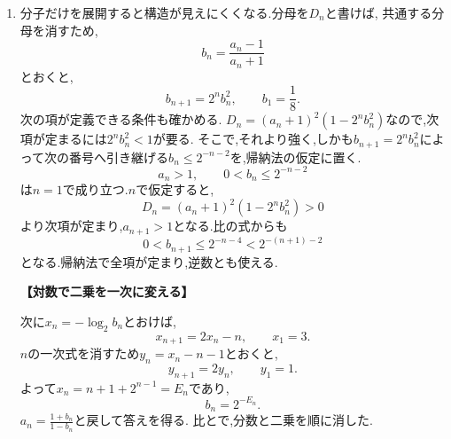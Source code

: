 \begin{enumerate}[label=\textbf{問\arabic*.},leftmargin=3.8em,format=\bookitemlink{practice-advanced}{solution}{problem}]
    \noindent \textbf{【別解】}\\
    を取らずに,積と商を作っても分離できる.
    \[
      P_n=a_nb_n,\qquad R_n=\frac{a_n}{b_n}
    \]
    とおくと,
    \BookMathLayout{
      \[
        \begin{aligned}
          P_{n+1}&=P_n^3,\quad P_1=4,\\
          R_{n+1}&=2^{4n+2}R_n,\quad R_1=1.
        \end{aligned}
      \]
    }{
      \[
        \begin{aligned}
          P_{n+1}&=P_n^3,\quad P_1=4,\\
          R_{n+1}&=2^{4n+2}R_n,\quad R_1=1.
        \end{aligned}
      \]
    }
    よって,
    \[
      P_n=2^{\,2\cdot3^{n-1}},\qquad
      R_n=2^{\,2(n^2-1)}.
    \]
    正値を使って$a_n=\sqrt{P_nR_n}$, $b_n=\sqrt{\frac{P_n}{R_n}}$と戻せば同じ答えになる.の和と差は,元のの積と商に対応する.
  \item 分子だけを展開すると構造が見えにくくなる.分母を$D_n$と書けば,
    \BookMathLayout{\[
        a_{n+1}-1=\frac{2^{n+1}(a_n-1)^2}{D_n},
        \qquad
        a_{n+1}+1=\frac{2(a_n+1)^2}{D_n}.
      \]}{
      \[
        \begin{aligned}
          a_{n+1}-1&=\frac{2^{n+1}(a_n-1)^2}{D_n},\\
          a_{n+1}+1&=\frac{2(a_n+1)^2}{D_n}.
        \end{aligned}
      \]
    }
    共通する分母を消すため,
    \[
      b_n=\frac{a_n-1}{a_n+1}
    \]
    とおくと,
    \[
      b_{n+1}=2^n b_n^2,\qquad b_1=\frac18.
    \]
    次の項が定義できる条件も確かめる.
    $D_n=(a_n+1)^2(1-2^nb_n^2)$なので,次項が定まるには$2^nb_n^2<1$が要る.
    そこで,それより強く,しかも$b_{n+1}=2^nb_n^2$によって次の番号へ引き継げる$b_n\le2^{-n-2}$を,帰納法の仮定に置く.
    \[
      a_n>1,\qquad 0<b_n\le2^{-n-2}
    \]
    は$n=1$で成り立つ.$n$で仮定すると,
    \[
      D_n=(a_n+1)^2(1-2^nb_n^2)>0
    \]
    より次項が定まり,$a_{n+1}>1$となる.比の式からも
    \[
      0<b_{n+1}\le2^{-n-4}<2^{-(n+1)-2}
    \]
    となる.帰納法で全項が定まり,逆数とも使える.

    \par\smallskip\noindent\textbf{【対数で二乗を一次に変える】}\par\nopagebreak[4]
    次に$x_n=-\log_2b_n$とおけば,
    \[
      x_{n+1}=2x_n-n,\qquad x_1=3.
    \]
    $n$の一次式を消すため$y_n=x_n-n-1$とおくと,
    \[
      y_{n+1}=2y_n,\qquad y_1=1.
    \]
    よって$x_n=n+1+2^{n-1}=E_n$であり,
    \[
      b_n=2^{-E_n}.
    \]
    $a_n=\frac{1+b_n}{1-b_n}$と戻して答えを得る.
    比とで,分数と二乗を順に消した.


\end{enumerate}
